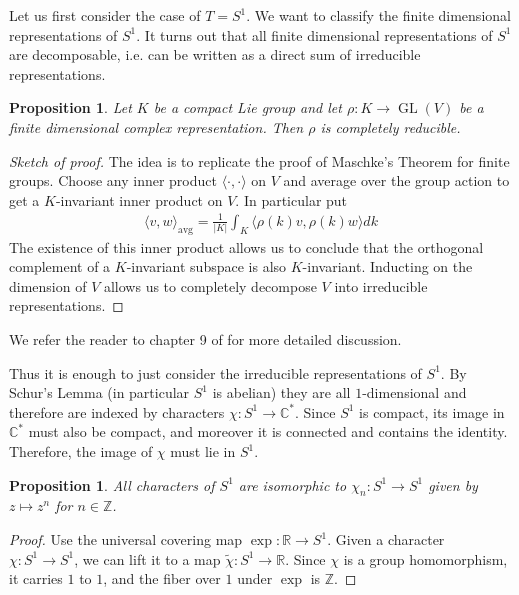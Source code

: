 \documentclass{amsart}
\DeclareMathOperator{\GL}{GL}
\newcommand{\C}{\mathbb{C}}
\newcommand{\R}{\mathbb{R}}
\newcommand{\Z}{\mathbb{Z}}
\newcommand{\abs}[1]{\lvert #1\vert}
\numberwithin{equation}{section}
\theoremstyle{plain} %
\newtheorem{proposition}[equation]{Proposition}
\theoremstyle{definition}
\theoremstyle{remark}
\begin{document}
\hfill

Let us first consider the case of $T = S^1$. We want to classify the finite dimensional representations of $S^1$.
It turns out that all finite dimensional representations of $S^1$ are decomposable, i.e.
can be written as a direct sum of irreducible representations.

\begin{proposition}
	Let $K$ be a compact Lie group and let $\rho:K\to\GL(V)$ be a finite dimensional complex representation.
	Then $\rho$ is completely reducible.
\end{proposition}

\begin{proof}
	[Sketch of proof] The idea is to replicate the proof of Maschke's Theorem for finite groups.
	Choose any inner product $\langle\cdot,\cdot\rangle$ on $V$ and average over the group action to get a $K$-invariant inner product
	on $V$. In particular put \begin{align*}
		\langle v,w\rangle_{\text{avg}} = \frac{1}{\abs{K}}\int_K \langle \rho(k)v,\rho(k)w\rangle dk
	\end{align*}
	The existence of this inner product
	allows us to conclude that the orthogonal complement of a $K$-invariant subspace is also $K$-invariant.
	Inducting on the dimension of $V$ allows us to completely decompose $V$ into irreducible representations.
\end{proof}

We refer the reader to chapter 9 of \cite{fulton-harris} for more detailed discussion.

\hfill

Thus it is enough to just consider the irreducible representations of $S^1$.
By Schur's Lemma (in particular $S^1$ is abelian) they are all $1$-dimensional and
therefore are indexed by characters $\chi: S^1\to \C^*$.
Since $S^1$ is compact, its image in $\C^*$ must also be compact, and moreover
it is connected and contains the identity. Therefore, the image of $\chi$ must lie in $S^1$.


\begin{proposition}
	All characters of $S^1$ are isomorphic to $\chi_n: S^1\to S^1$ given by $z\mapsto z^n$ for $n\in \Z$.
\end{proposition}

\begin{proof}
	Use the universal covering map $\exp: \R\to S^1$.
	Given a character $\chi: S^1\to S^1$, we can lift it to a map $\tilde \chi: S^1\to \R$.
	Since $\chi$ is a group homomorphism, it carries $1$ to $1$, and the fiber over $1$ under $\exp$ is $\Z$.
\end{proof}
\end{document}
